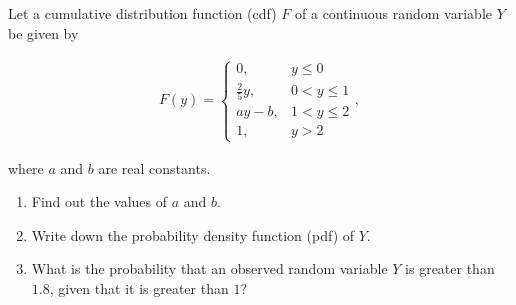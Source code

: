 
\begin{exercise}

Let a cumulative distribution function (cdf) $F$ of a continuous random variable $Y$ be given by

\begin{align*}
    F(y)
    =
    \begin{cases}
        0,             & y \leq 0     \\
        \frac{2}{5} y, & 0 < y \leq 1 \\
        a y - b,       & 1 < y \leq 2 \\
        1,             & y > 2
    \end{cases},
\end{align*}

where $a$ and $b$ are real constants.

\begin{enumerate}[label = (\alph*)]
    \item Find out the values of $a$ and $b$.
    \item Write down the probability density function (pdf) of $Y$.
    \item What is the probability that an observed random variable $Y$ is greater than $1.8$, given that it is greater than $1$?    
\end{enumerate}

\end{exercise}


